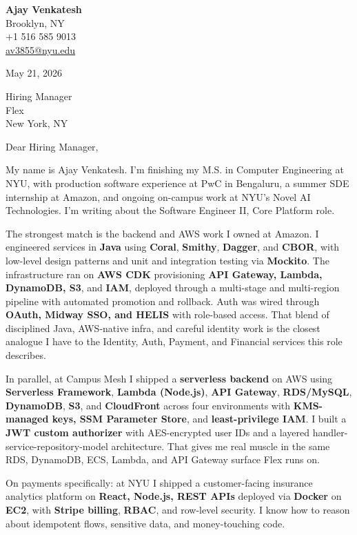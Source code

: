 \documentclass[letterpaper,11pt]{article}
\begin{document}
\begin{flushleft}
\textbf{\large Ajay Venkatesh} \\
Brooklyn, NY \\
+1 516 585 9013 \\
\href{mailto:av3855@nyu.edu}{av3855@nyu.edu}
\end{flushleft}
\vspace{10pt}
May 21, 2026
\vspace{6pt}

Hiring Manager \\
Flex \\
New York, NY

\vspace{10pt}

Dear Hiring Manager,

My name is Ajay Venkatesh. I'm finishing my M.S. in Computer Engineering at NYU, with production software experience at PwC in Bengaluru, a summer SDE internship at Amazon, and ongoing on-campus work at NYU's Novel AI Technologies. I'm writing about the Software Engineer II, Core Platform role.

The strongest match is the backend and AWS work I owned at Amazon. I engineered services in \textbf{Java} using \textbf{Coral}, \textbf{Smithy}, \textbf{Dagger}, and \textbf{CBOR}, with low-level design patterns and unit and integration testing via \textbf{Mockito}. The infrastructure ran on \textbf{AWS CDK} provisioning \textbf{API Gateway, Lambda, DynamoDB, S3}, and \textbf{IAM}, deployed through a multi-stage and multi-region pipeline with automated promotion and rollback. Auth was wired through \textbf{OAuth, Midway SSO, and HELIS} with role-based access. That blend of disciplined Java, AWS-native infra, and careful identity work is the closest analogue I have to the Identity, Auth, Payment, and Financial services this role describes.

In parallel, at Campus Mesh I shipped a \textbf{serverless backend} on AWS using \textbf{Serverless Framework}, \textbf{Lambda (Node.js)}, \textbf{API Gateway}, \textbf{RDS/MySQL}, \textbf{DynamoDB}, \textbf{S3}, and \textbf{CloudFront} across four environments with \textbf{KMS-managed keys, SSM Parameter Store}, and \textbf{least-privilege IAM}. I built a \textbf{JWT custom authorizer} with AES-encrypted user IDs and a layered handler-service-repository-model architecture. That gives me real muscle in the same RDS, DynamoDB, ECS, Lambda, and API Gateway surface Flex runs on.

On payments specifically: at NYU I shipped a customer-facing insurance analytics platform on \textbf{React, Node.js, REST APIs} deployed via \textbf{Docker} on \textbf{EC2}, with \textbf{Stripe billing}, \textbf{RBAC}, and row-level security. I know how to reason about idempotent flows, sensitive data, and money-touching code.
\end{document}

